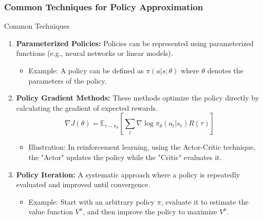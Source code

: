 \documentclass[aspectratio=169]{beamer}
\begin{document}
\begin{frame}[fragile]
    \frametitle{Common Techniques for Policy Approximation}
    \begin{block}{Common Techniques}
        \begin{enumerate}
            \item \textbf{Parameterized Policies:}
            Policies can be represented using parameterized functions (e.g., neural networks or linear models).
            \begin{itemize}
                \item Example: A policy can be defined as \( \pi(a | s; \theta) \) where \( \theta \) denotes the parameters of the policy.
            \end{itemize}
            
            \item \textbf{Policy Gradient Methods:}
            These methods optimize the policy directly by calculating the gradient of expected rewards.
            \begin{equation}
                \nabla J(\theta) = \mathbb{E}_{\tau \sim \pi_\theta} \left[ \sum_t \nabla \log \pi_\theta(a_t | s_t) R(\tau) \right]
            \end{equation}
            \begin{itemize}
                \item Illustration: In reinforcement learning, using the Actor-Critic technique, the "Actor" updates the policy while the "Critic" evaluates it.
            \end{itemize}

            \item \textbf{Policy Iteration:}
            A systematic approach where a policy is repeatedly evaluated and improved until convergence.
            \begin{itemize}
                \item Example: Start with an arbitrary policy \( \pi \), evaluate it to estimate the value function \( V^{\pi} \), and then improve the policy to maximize \( V^{\pi} \).
            \end{itemize}
        \end{enumerate}
    \end{block}
\end{frame}
\end{document}
